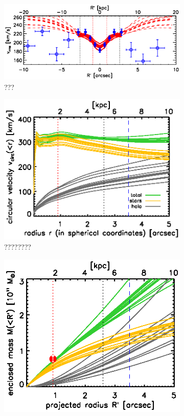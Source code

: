 \documentclass[useAMS,usenatbib]{mn2e}
\begin{document}
\begin{figure}
\centering
\begin{subfigure}{\textwidth}
  \centering
  \includegraphics[width=0.8\linewidth]{fig/B4_rms_error_curves.ps}
  \caption{???}
  \label{fig:???}
\end{subfigure}
\begin{subfigure}{.5\textwidth}
  \centering
  \includegraphics[width=0.9\linewidth]{fig/B4_jam_profiles_errors_short_vcirc.ps}
  \caption{????????}
  \label{fig:???}
\end{subfigure}%
\begin{subfigure}{.5\textwidth}
  \centering
  \includegraphics[width=0.9\linewidth]{fig/B4_jam_profiles_errors_short_projmass.ps}

\end{subfigure}
\end{figure}
\end{document}
